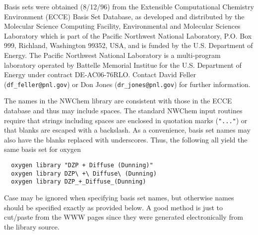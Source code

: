 \label{knownbasis}

Basis sets were obtained (8/12/96) from the Extensible Computational
Chemistry Environment (ECCE) Basis Set Database, as developed and distributed
by the Molecular Science Computing Facility, Environmental and
Molecular Sciences Laboratory which is part of the Pacific Northwest
National Laboratory, P.O. Box 999, Richland, Washington 99352, USA,
and is funded by the U.S. Department of Energy.  The Pacific Northwest
National Laboratory is a multi-program laboratory operated by Battelle
Memorial Institue for the U.S. Department of Energy under contract
DE-AC06-76RLO.  Contact David Feller (\verb+df_feller@pnl.gov+) or Don
Jones (\verb+dr_jones@pnl.gov+) for further information.

The names in the NWChem library are consistent with those in the ECCE
database and thus may include spaces.  The standard NWChem input
routines require that strings including spaces are enclosed in
quotation marks (\verb+"..."+) or that blanks are escaped with a
backslash.  As a convenience, basis set names may also have the blanks
replaced with underscores.  Thus, the following all yield the same
basis set for oxygen
\begin{verbatim}
  oxygen library "DZP + Diffuse (Dunning)"
  oxygen library DZP\ +\ Diffuse\ (Dunning)
  oxygen library DZP_+_Diffuse_(Dunning)
\end{verbatim}

Case may be ignored when specifying basis set names, but otherwise
names should be specified exactly as provided below.  A good method is
just to cut/paste from the WWW pages since they were generated
electronically from the library source.

